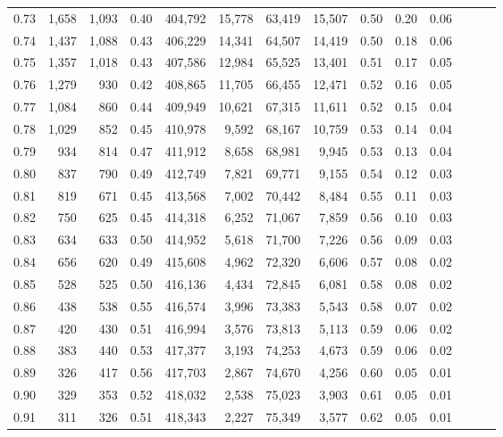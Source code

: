 \begin{tabular}{rrrrrrrrrrrrrr}
0.73 &  1,658 &  1,093 &  0.40 &  404,792 &   15,778 &  63,419 &  15,507 &  0.50 &  0.20 &      0.06 \\
0.74 &  1,437 &  1,088 &  0.43 &  406,229 &   14,341 &  64,507 &  14,419 &  0.50 &  0.18 &      0.06 \\
0.75 &  1,357 &  1,018 &  0.43 &  407,586 &   12,984 &  65,525 &  13,401 &  0.51 &  0.17 &      0.05 \\
0.76 &  1,279 &    930 &  0.42 &  408,865 &   11,705 &  66,455 &  12,471 &  0.52 &  0.16 &      0.05 \\
0.77 &  1,084 &    860 &  0.44 &  409,949 &   10,621 &  67,315 &  11,611 &  0.52 &  0.15 &      0.04 \\
0.78 &  1,029 &    852 &  0.45 &  410,978 &    9,592 &  68,167 &  10,759 &  0.53 &  0.14 &      0.04 \\
0.79 &    934 &    814 &  0.47 &  411,912 &    8,658 &  68,981 &   9,945 &  0.53 &  0.13 &      0.04 \\
0.80 &    837 &    790 &  0.49 &  412,749 &    7,821 &  69,771 &   9,155 &  0.54 &  0.12 &      0.03 \\
0.81 &    819 &    671 &  0.45 &  413,568 &    7,002 &  70,442 &   8,484 &  0.55 &  0.11 &      0.03 \\
0.82 &    750 &    625 &  0.45 &  414,318 &    6,252 &  71,067 &   7,859 &  0.56 &  0.10 &      0.03 \\
0.83 &    634 &    633 &  0.50 &  414,952 &    5,618 &  71,700 &   7,226 &  0.56 &  0.09 &      0.03 \\
0.84 &    656 &    620 &  0.49 &  415,608 &    4,962 &  72,320 &   6,606 &  0.57 &  0.08 &      0.02 \\
0.85 &    528 &    525 &  0.50 &  416,136 &    4,434 &  72,845 &   6,081 &  0.58 &  0.08 &      0.02 \\
0.86 &    438 &    538 &  0.55 &  416,574 &    3,996 &  73,383 &   5,543 &  0.58 &  0.07 &      0.02 \\
0.87 &    420 &    430 &  0.51 &  416,994 &    3,576 &  73,813 &   5,113 &  0.59 &  0.06 &      0.02 \\
0.88 &    383 &    440 &  0.53 &  417,377 &    3,193 &  74,253 &   4,673 &  0.59 &  0.06 &      0.02 \\
0.89 &    326 &    417 &  0.56 &  417,703 &    2,867 &  74,670 &   4,256 &  0.60 &  0.05 &      0.01 \\
0.90 &    329 &    353 &  0.52 &  418,032 &    2,538 &  75,023 &   3,903 &  0.61 &  0.05 &      0.01 \\
0.91 &    311 &    326 &  0.51 &  418,343 &    2,227 &  75,349 &   3,577 &  0.62 &  0.05 &      0.01 \\

\end{tabular}
